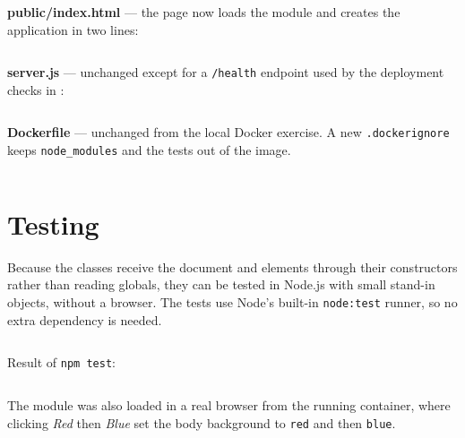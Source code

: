 \medskip\noindent\textbf{public/index.html} --- the page now loads the module
and creates the application in two lines:
\inputminted{html}{../website/color-buttons-app/public/index.html}

\medskip\noindent\textbf{server.js} --- unchanged except for a
\texttt{/health} endpoint used by the deployment checks in
:
\inputminted{javascript}{../website/color-buttons-app/server.js}

\medskip\noindent\textbf{Dockerfile} --- unchanged from the local Docker
exercise. A new \texttt{.dockerignore} keeps \texttt{node\_modules} and the
tests out of the image.
\inputminted{docker}{../website/color-buttons-app/Dockerfile}

\section{Testing}
Because the classes receive the document and elements through their
constructors rather than reading globals, they can be tested in Node.js with
small stand-in objects, without a browser. The tests use Node's built-in
\texttt{node:test} runner, so no extra dependency is needed.
\inputminted{javascript}{../website/color-buttons-app/test/colorButtons.test.js}
Result of \texttt{npm test}:
\inputminted{console}{../evidence/website-unit-tests.txt}
The module was also loaded in a real browser from the running container, where
clicking \emph{Red} then \emph{Blue} set the body background to
\texttt{red} and then \texttt{blue}.
